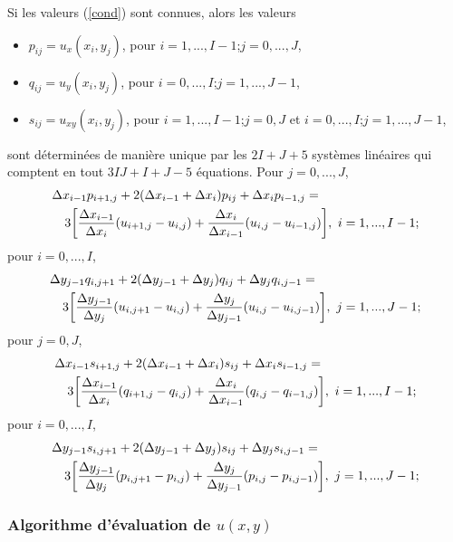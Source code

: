 \begin{lemme}
Si les valeurs (\ref{cond}) sont connues, alors les valeurs
\begin{itemize}
\item $p_{ij}=u_x(x_i,y_j)$, pour $i=1,...,I-1$;$j=0,...,J$,
\item $q_{ij}=u_y(x_i,y_j)$, pour $i=0,...,I$;$j=1,...,J-1$,
\item $s_{ij}=u_{xy}(x_i,y_j)$, pour $i=1,...,I-1$;$j=0,J$ et 
$i=0,...,I$;$j=1,...,J-1$,
\end{itemize}
sont d\'etermin\'ees de mani\`ere unique par les $2I+J+5$ 
syst\`emes lin\'eaires qui comptent en tout $3IJ+I+J-5$ \'equations. 
Pour $j=0,...,J$, 
\begin{eqnarray}
\lefteqn{\Delta x_{i-1}p_{i+1,j}+2(\Delta x_{i-1}+\Delta x_i)p_{ij} 
+ \Delta x_i p_{i-1,j} = } \nonumber \\
&& 3\biggl [ \frac{\Delta x_{i-1}}{\Delta x_i}(u_{i+1,j}-u_{i,j}) 
+ \frac{\Delta x_i}{\Delta x_{i-1}}(u_{i,j}-u_{i-1,j})\biggr ],
~ i=1,...,I-1; \label{syst_spline1}
\end{eqnarray}
pour $i=0,...,I$,   
\begin{eqnarray}
\lefteqn{\Delta y_{j-1}q_{i,j+1}+2(\Delta y_{j-1}+\Delta y_j)q_{ij} 
+ \Delta y_j q_{i,j-1} = } \nonumber \\
&& 3\biggl [ \frac{\Delta y_{j-1}}{\Delta y_j}(u_{i,j+1}-u_{i,j}) 
+ \frac{\Delta y_j}{\Delta y_{j-1}}(u_{i,j}-u_{i,j-1})\biggr ],
~ j=1,...,J-1; \label{syst_spline2}
\end{eqnarray}
pour $j=0,J$,   
\begin{eqnarray}
\lefteqn{\Delta x_{i-1}s_{i+1,j}+2(\Delta x_{i-1}+\Delta x_i)s_{ij} 
+ \Delta x_i s_{i-1,j} = } \nonumber \\
&& 3\biggl [ \frac{\Delta x_{i-1}}{\Delta x_i}(q_{i+1,j}-q_{i,j}) 
+ \frac{\Delta x_i}{\Delta x_{i-1}}(q_{i,j}-q_{i-1,j})\biggr ],
~ i=1,...,I-1; \label{syst_spline3}
\end{eqnarray}
pour $i=0,...,I$, 
\begin{eqnarray}
\lefteqn{\Delta y_{j-1}s_{i,j+1}+2(\Delta y_{j-1}+\Delta y_j)s_{ij} 
+ \Delta y_j s_{i,j-1} = } \nonumber \\
&& 3\biggl [ \frac{\Delta y_{j-1}}{\Delta y_j}(p_{i,j+1}-p_{i,j}) 
+ \frac{\Delta y_j}{\Delta y_{j-1}}(p_{i,j}-p_{i,j-1})\biggr ],
~ j=1,...,J-1; \label{syst_spline4}
\end{eqnarray}
\end{lemme}

\subsubsection*{Algorithme d'\'evaluation de $u(x,y)$} 

